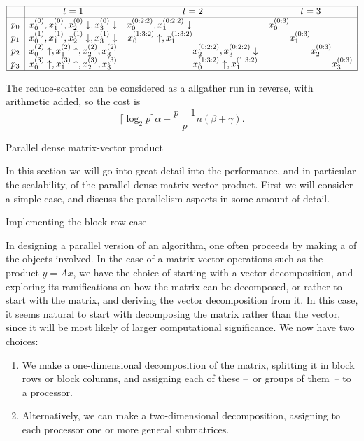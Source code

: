 \[
\begin{array}{|c|ccc|}
\hline
  &t=1&t=2&t=3\\ \hline
p_0&x_0^{(0)},x_1^{(0)},x_2^{(0)}\downarrow,x_3^{(0)}\downarrow
   &x_0^{(0:2:2)},x_1^{(0:2:2)}\downarrow
    \hphantom{x_0^{(0:2:2)},x_1^{(0:2:2)}\downarrow}
   &x_0^{(0:3)}
    \hphantom{x_3^{(0:3)}x_3^{(0:3)}x_3^{(0:3)}}\\
p_1&x_0^{(1)},x_1^{(1)},x_2^{(1)}\downarrow,x_3^{(1)}\downarrow
   &x_0^{(1:3:2)}\uparrow,x_1^{(1:3:2)}
    \hphantom{x_0^{(0:2:2)},x_1^{(0:2:2)}\downarrow}
   &\hphantom{x_3^{(0:3)}} x_1^{(0:3)}
    \hphantom{x_3^{(0:3)}x_3^{(0:3)}} \\
p_2&x_0^{(2)}\uparrow,x_1^{(2)}\uparrow,x_2^{(2)},x_3^{(2)}
   &\hphantom{x_0^{(0:2:2)},x_1^{(0:2:2)}\downarrow}
    x_2^{(0:2:2)},x_3^{(0:2:2)}\downarrow
   &\hphantom{x_3^{(0:3)}x_3^{(0:3)}} x_2^{(0:3)}
    \hphantom{x_3^{(0:3)}}\\
p_3&x_0^{(3)}\uparrow,x_1^{(3)}\uparrow,x_2^{(3)},x_3^{(3)}
   &\hphantom{x_0^{(0:2:2)},x_1^{(0:2:2)}\downarrow}
    x_0^{(1:3:2)}\uparrow,x_1^{(1:3:2)}
   &\hphantom{x_3^{(0:3)}x_3^{(0:3)}x_3^{(0:3)}}
    x_3^{(0:3)}\\
\hline
\end{array}
\]

The reduce-scatter can be considered as a allgather run in reverse,
with arithmetic added, so the cost is 
\[ \lceil \log_2 p\rceil\alpha +\frac{p-1}pn(\beta+\gamma). \]



 {Parallel dense matrix-vector product}
\label{sec:parallel-dense-mvp}

In this section we will go into great detail into the performance, and
in particular the scalability, of the parallel dense matrix-vector
product. First we will consider a simple case, and discuss the
parallelism aspects in some amount of detail.

 {Implementing the block-row case}
\label{sec:blockrow}

In designing a parallel version of an algorithm, one often proceeds by
making a  of the objects involved. In
the case of a matrix-vector operations such as the product $y=Ax$, we
have the choice of starting with a vector decomposition, and exploring
its ramifications on how the matrix can be decomposed, or rather to
start with the matrix, and deriving the vector decomposition from it.
In this case, it seems natural to start with decomposing the matrix
rather than the vector, since it will be most likely of larger
computational significance. We now have two choices:
\begin{enumerate}
\item We make a one-dimensional decomposition of the matrix, splitting
  it in block rows or block columns, and assigning each of these --~or
  groups of them~-- to a processor.
\item Alternatively, we can make a two-dimensional decomposition,
  assigning to each processor one or more general submatrices.
\end{enumerate}

